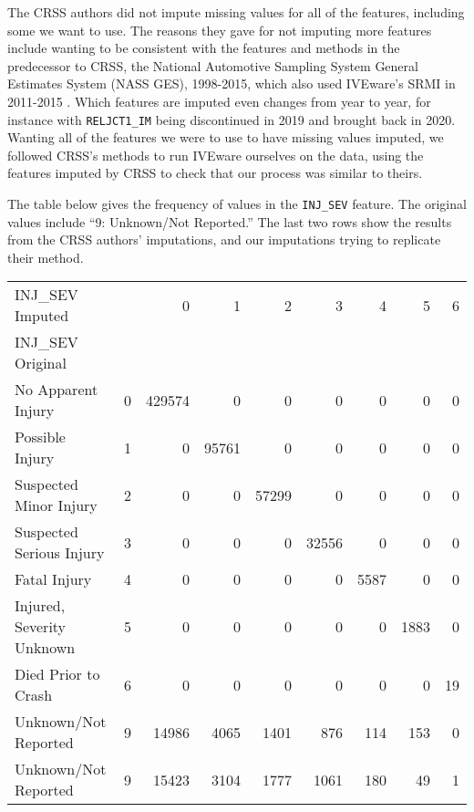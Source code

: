 The CRSS authors did not impute missing values for all of the features, including some we want to use.  The reasons they gave for not imputing more features include wanting to be consistent with the features and methods in the predecessor to CRSS, the National Automotive Sampling System General Estimates System (NASS GES), 1998-2015, which also used IVEware's SRMI in 2011-2015
\citep{CRSS_Imputation}.  Which features are imputed even changes from year to year, for instance with \verb|RELJCT1_IM| being discontinued in 2019 and brought back in 2020.  
Wanting all of the features we were to use to have missing values imputed, we followed CRSS's methods to run IVEware ourselves on the data, using the features imputed by CRSS to check that our process was similar to theirs.  

The table below gives the frequency of values in the \verb|INJ_SEV| feature.  The original values include ``9:  Unknown/Not Reported.''  The last two rows show the results from the CRSS authors' imputations, and our imputations trying to replicate their method.  

\begin{tabular}{llrrrrrrr}
\toprule
INJ\_SEV Imputed &&       0 &      1 &      2 &      3 &     4 &     5 &   6 \\
INJ\_SEV Original &&         &        &        &        &       &       &     \\
\midrule
No Apparent Injury  & 0       &  429574 &      0 &      0 &      0 &     0 &     0 &   0 \\
Possible Injury & 1       &       0 &  95761 &      0 &      0 &     0 &     0 &   0 \\
Suspected Minor Injury & 2       &       0 &      0 &  57299 &      0 &     0 &     0 &   0 \\
Suspected Serious Injury & 3       &       0 &      0 &      0 &  32556 &     0 &     0 &   0 \\
Fatal Injury & 4       &       0 &      0 &      0 &      0 &  5587 &     0 &   0 \\
Injured, Severity Unknown & 5       &       0 &      0 &      0 &      0 &     0 &  1883 &   0 \\
Died Prior to Crash & 6       &       0 &      0 &      0 &      0 &     0 &     0 &  19 \\
Unknown/Not Reported & 9       &   14986 &   4065 &   1401 &    876 &   114 &   153 &   0 \\
Unknown/Not Reported & 9       &   15423 &   3104 &   1777 &   1061 &   180 &    49 &   1 \\
\bottomrule
\end{tabular}



